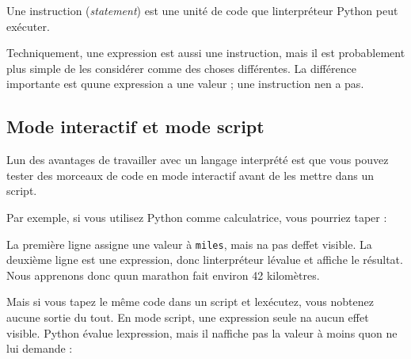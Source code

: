 Une instruction (\emph{statement}) est une unité de code que
l\textquotesingle interpréteur Python peut exécuter.

Techniquement, une expression est aussi une instruction, mais il est
probablement plus simple de les considérer comme des choses différentes.
La différence importante est qu\textquotesingle une expression a une
valeur ; une instruction n\textquotesingle en a pas.

\hypertarget{mode-interactif-et-mode-script}{%
\subsection{Mode interactif et mode
script}\label{mode-interactif-et-mode-script}}

L\textquotesingle un des avantages de travailler avec un langage
interprété est que vous pouvez tester des morceaux de code en mode
interactif avant de les mettre dans un script.

Par exemple, si vous utilisez Python comme calculatrice, vous pourriez
taper :

\begin{Shaded}
\begin{Highlighting}[]
\OperatorTok{\textgreater{}\textgreater{}\textgreater{}}\OperatorTok{=} 
\OperatorTok{\textgreater{}\textgreater{}\textgreater{}}\OperatorTok{*} 
\end{Highlighting}
\end{Shaded}

La première ligne assigne une valeur à \texttt{miles}, mais
n\textquotesingle a pas d\textquotesingle effet visible. La deuxième
ligne est une expression, donc l\textquotesingle interpréteur
l\textquotesingle évalue et affiche le résultat. Nous apprenons donc
qu\textquotesingle un marathon fait environ 42 kilomètres.

Mais si vous tapez le même code dans un script et
l\textquotesingle exécutez, vous n\textquotesingle obtenez aucune sortie
du tout. En mode script, une expression seule n\textquotesingle a aucun
effet visible. Python évalue l\textquotesingle expression, mais il
n\textquotesingle affiche pas la valeur à moins qu\textquotesingle on ne
lui demande :

\begin{Shaded}
\begin{Highlighting}[]
\OperatorTok{=} 
\OperatorTok{*} \NormalTok{)}
\end{Highlighting}
\end{Shaded}

